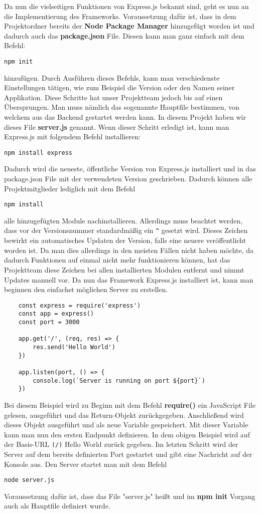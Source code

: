 Da nun die vielseitigen Funktionen von Express.js bekannt sind, geht es nun an die Implementierung des Frameworks. Voraussetzung dafür ist, dass in dem Projektordner bereits der \textbf{Node Package Manager} hinzugefügt worden ist und dadurch auch das \textbf{package.json} File. Diesen kann man ganz einfach mit dem Befehl:
\begin{verbatim}
npm init
\end{verbatim}
hinzufügen. Durch Ausführen dieses Befehls, kann man verschiedenste Einstellungen tätigen, wie zum Beispiel die Version oder den Namen seiner Applikation. Diese Schritte hat unser Projektteam jedoch bis auf einen Übersprungen. Man muss nämlich das sogenannte Hauptfile bestimmen, von welchem aus das Backend gestartet werden kann. In diesem Projekt haben wir dieses File \textbf{server.js} genannt. Wenn dieser Schritt erledigt ist, kann man Express.js mit folgendem Befehl installieren:
\begin{verbatim}
npm install express
\end{verbatim}
Dadurch wird die neueste, öffentliche Version von Express.js installiert und in das package.json File mit der verwendeten Version geschrieben. Dadurch können alle Projektmitglieder lediglich mit dem Befehl
\begin{verbatim}
npm install
\end{verbatim}
alle hinzugefügten Module nachinstallieren. Allerdings muss beachtet werden, dass vor der Versionsnummer standardmäßig ein \verb|^| gesetzt wird. Dieses Zeichen bewirkt ein automatisches Updaten der Version, falls eine neuere veröffentlicht worden ist. Da man dies allerdings in den meisten Fällen nicht haben möchte, da dadurch Funktionen auf einmal nicht mehr funktionieren können, hat das Projektteam diese Zeichen bei allen installierten Modulen entfernt und nimmt Updates manuell vor.
\newline
\cite{installing_express_js}
\newline
Da nun das Framework Express.js installiert ist, kann man beginnen den einfachst möglichen Server zu erstellen.
\begin{lstlisting}
    const express = require('express')
    const app = express()
    const port = 3000

    app.get('/', (req, res) => {
        res.send('Hello World')
    })

    app.listen(port, () => {
        console.log(`Server is running on port ${port}`)
    })
\end{lstlisting}
Bei diesem Beispiel wird zu Beginn mit dem Befehl \textbf{require()} ein JavaScript File gelesen, ausgeführt und das Return-Objekt zurückgegeben. Anschließend wird dieses Objekt ausgeführt und als neue Variable gespeichert. Mit dieser Variable kann man nun den ersten Endpunkt definieren. In dem obigen Beispiel wird auf der Basis-URL \verb|(/)| Hello World zurück gegeben. Im letzten Schritt wird der Server auf dem bereits definierten Port gestartet und gibt eine Nachricht auf der Konsole aus. Den Server startet man mit dem Befehl
\begin{verbatim}
node server.js
\end{verbatim}
Voraussetzung dafür ist, dass das File "server.js" heißt und im \textbf{npm init} Vorgang auch als Hauptfile definiert wurde.
\newline
\cite{creating_basic_server}